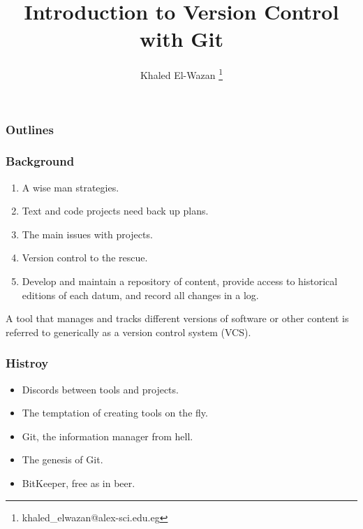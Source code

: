 \documentclass[22pt]{beamer}
\title{Introduction to Version Control with Git \cite{loeliger2012version}}
\author{Khaled El-Wazan \thanks{khaled\_elwazan@alex-sci.edu.eg}}
\institute{Department of Mathematics and Computer Science, Faculty of Science, Alexandria University}
\date{}
\begin{document}
\Large
\maketitle


\begin{frame}
    \frametitle{Outlines}
    \tableofcontents
\end{frame}


\begin{frame}
    \frametitle{Background}
    \begin{enumerate}
        \item A wise man strategies.
        \item Text and code projects need back up plans.
        \item The main issues with projects.
        \item Version control to the rescue.


              \pause
        \item Develop and maintain a repository of content, provide access to historical editions
              of each datum, and record all changes in a log.
    \end{enumerate}
    \pause
    \begin{definition}
        A tool that manages and tracks different versions of software or other content is referred
        to generically as a version control system (VCS).
    \end{definition}

\end{frame}


\begin{frame}
    \frametitle{Histroy}
    \begin{itemize}
        \item Discords between tools and projects.
        \item The temptation of creating tools on the fly.
        \item Git, the information manager from hell.
        \item The genesis of Git.
        \item BitKeeper, free as in beer.
    \end{itemize}


\end{frame}
\end{document}
